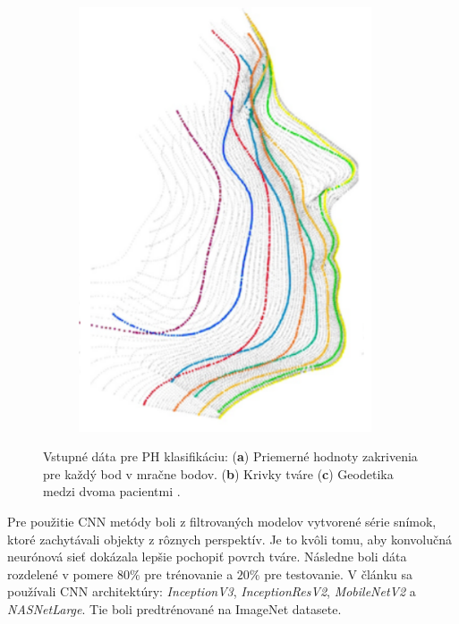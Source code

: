 \begin{figure}[h]
\begin{subfigure}[b]{0.32\textwidth}
		\includegraphics[width=0.95\textwidth]{figures/resers_c.png}
		\caption{}
		\label{fig:resers:c}
	\end{subfigure}
	\caption{Vstupné dáta pre PH klasifikáciu: (\textbf{a}) Priemerné hodnoty zakrivenia pre každý bod v mračne bodov. 
	(\textbf{b}) Krivky tváre
	(\textbf{c}) Geodetika medzi dvoma pacientmi \cite{Kiaee2019DiagnosisOP}. }
	\label{fig:resers:1}
\end{figure}

\newpage


Pre použitie CNN metódy boli z filtrovaných modelov vytvorené série snímok, ktoré zachytávali objekty z rôznych perspektív. Je to kvôli tomu, aby konvolučná neurónová sieť dokázala lepšie pochopiť povrch tváre. Následne boli dáta rozdelené v pomere $80\%$ pre trénovanie a $20\%$ pre testovanie. V článku sa používali CNN architektúry: \textit{InceptionV3}, \textit{InceptionResV2}, \textit{MobileNetV2} a \textit{NASNetLarge}. Tie boli predtrénované na ImageNet datasete. 

